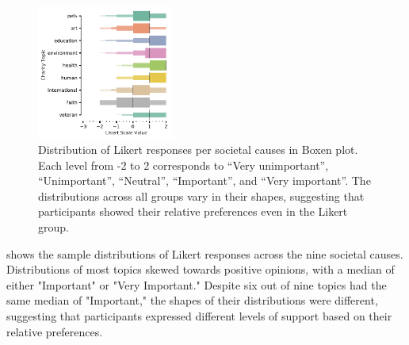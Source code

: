 
\begin{figure}[htpb]
    \centering
    \includegraphics[width=0.4\textwidth, keepaspectratio=true]{content/image/likert_distribution_per_topic.pdf}
    \caption{
      Distribution of Likert responses per societal causes in Boxen plot. 
      Each level from -2 to 2 corresponds to 
      ``Very unimportant'', ``Unimportant'', ``Neutral'', ``Important'', and ``Very important''.
      The distributions across all groups vary in their shapes, suggesting that participants showed their relative preferences even in the Likert group.
    }
    \label{fig:likert_exp1}
\end{figure}


 shows the sample distributions of Likert responses across the nine societal causes. Distributions of most topics skewed towards positive opinions, with a median of either "Important" or "Very Important." Despite six out of nine topics had the same median of "Important," the shapes of their distributions were different, suggesting that participants expressed different levels of support based on their relative preferences. 

